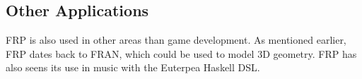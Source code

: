 \subsection{Other Applications}
\gls{FRP} is also used in other areas than game development. As mentioned earlier, \gls{FRP} dates back to FRAN, which could be used to model 3D geometry\cite{ElliottHudak97:Fran}. \gls{FRP} has also seens its use in music with the Euterpea Haskell \gls{DSL}\cite{euterpea}.